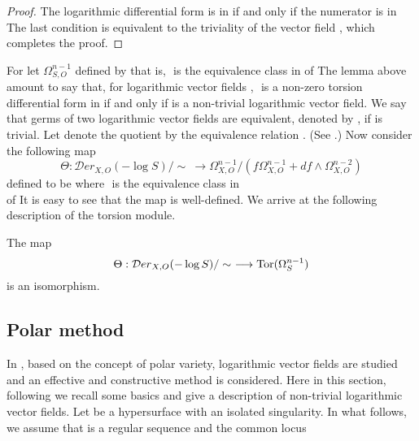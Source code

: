 \documentclass{arxsigma}
\begin{document}
\begin{proof}
The logarithmic differential form
  is in
  if and only if the numerator
  is in
  The last condition is
equivalent to the triviality of the vector field  , which completes the proof.
\end{proof}
For   let $
  \Omega_{S, O}^{n-1} $
defined by   that is, $
$ is the equivalence class in
  of  
The lemma above amount to say that, for logarithmic vector fields  ,
$
$ is a non-zero torsion differential form
in   if and only if   is a non-trivial logarithmic vector field.
We say that germs of two logarithmic vector fields   are
equivalent, denoted by  , if   is trivial.
Let   denote the quotient by the equivalence relation  . (See
\cite{T}.)
Now consider the following map
\begin{equation*}
\Theta:{\mathcal Der}_{X, O}(-\log S)/\sim \ \longrightarrow
\Omega_{X, O}^{n-1} /(f \Omega_{X, O}^{n-1} + df \wedge \Omega_{X, O}^{n-2})
\end{equation*}
defined to be   where $
$
is the equivalence class in \\  
of   It is easy to see that the map   is well-defined.
We arrive at the following description of the torsion module.
\begin{theorem}
The map
\begin{equation*}
\Theta :{\mathcal Der}_{X, O}(-\log S)/\sim \ \longrightarrow{\rm Tor}(\Omega_{S}^{n-1})
\end{equation*}
is an isomorphism.
\end{theorem}
\subsection{Polar method}
In \cite{T}, based on the concept of polar variety,
logarithmic vector fields are studied and an effective and constructive method is considered. Here in this section, following \cite{NT19a, T} we recall some basics and give a description of non-trivial logarithmic vector fields.
Let   be a hypersurface with an isolated singularity. In what follows,
we assume that  
is a regular sequence and the common locus
   
\end{document}
